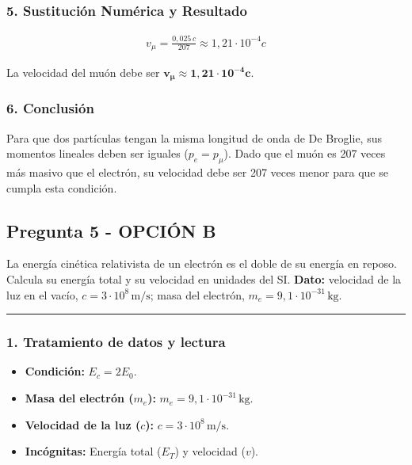 \subsubsection*{5. Sustitución Numérica y Resultado}
\begin{gather}
    v_{\mu} = \frac{0,025\,c}{207} \approx 1,21\cdot10^{-4}c
\end{gather}
\begin{cajaresultado}
    La velocidad del muón debe ser $\boldsymbol{v_{\mu} \approx 1,21\cdot10^{-4}c}$.
\end{cajaresultado}
\subsubsection*{6. Conclusión}
\begin{cajaconclusion}
Para que dos partículas tengan la misma longitud de onda de De Broglie, sus momentos lineales deben ser iguales ($p_e = p_{\mu}$). Dado que el muón es 207 veces más masivo que el electrón, su velocidad debe ser 207 veces menor para que se cumpla esta condición.
\end{cajaconclusion}
\newpage

\subsection{Pregunta 5 - OPCIÓN B}
\label{subsec:5B_2018_jul_ext}
\begin{cajaenunciado}
La energía cinética relativista de un electrón es el doble de su energía en reposo. Calcula su energía total y su velocidad en unidades del SI.
\textbf{Dato:} velocidad de la luz en el vacío, $c=3\cdot10^{8}\,\text{m/s}$; masa del electrón, $m_e=9,1\cdot10^{-31}\,\text{kg}$.
\end{cajaenunciado}
\hrule
\subsubsection*{1. Tratamiento de datos y lectura}
\begin{itemize}
    \item \textbf{Condición:} $E_c = 2E_0$.
    \item \textbf{Masa del electrón ($m_e$):} $m_e=9,1\cdot10^{-31}\,\text{kg}$.
    \item \textbf{Velocidad de la luz ($c$):} $c=3\cdot10^{8}\,\text{m/s}$.
    \item \textbf{Incógnitas:} Energía total ($E_T$) y velocidad ($v$).
\end{itemize}
